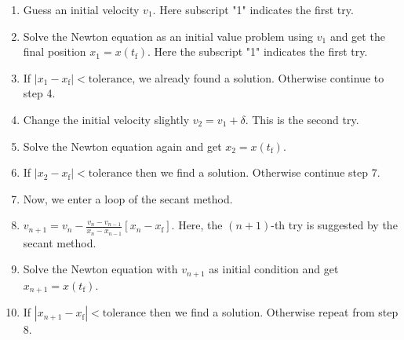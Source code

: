 \bigskip 
\begin{myalgobox}
    \label{algo:shooting}
    \medskip
    \begin{minipage}{5.5in}
        \begin{enumerate}
            \item Guess an initial velocity $v_1$.  Here subscript "1" indicates the first try.
            \item Solve the Newton equation as an initial value problem using $v_1$ and get the final position  $x_1=x(t_\text{f})$.  Here the subscript "1" indicates the first try.
            \item If $|x_1 - x_\text{f}| < \text{tolerance}$, we already found a solution. Otherwise continue to step 4.
            \item Change the initial velocity slightly $v_2 = v_1 + \delta$.  This is the second try.
            \item Solve the Newton equation again and get $x_2=x(t_\text{f})$.
            \item If $|x_2 - x_\text{f}| < \text{tolerance}$ then we find a solution.  Otherwise continue step 7.
            \item Now, we enter a loop of the secant method.
            \item $v_{n+1} = v_{n} - \displaystyle\frac{v_{n} - v_{n-1}}{x_{n}-x_{n-1}} \left [ x_n - x_\text{f} \right ]$.  Here, the $(n+1)$-th try is suggested by the secant method.
            \item Solve the Newton equation with $v_{n+1}$ as initial condition and get $x_{n+1} = x(t_\text{f})$.
            \item If $|x_{n+1} - x_\text{f}| < \text{tolerance}$ then we find a solution.  Otherwise repeat from step 8.
        \end{enumerate}
    \end{minipage}
\end{myalgobox}


\bigskip

